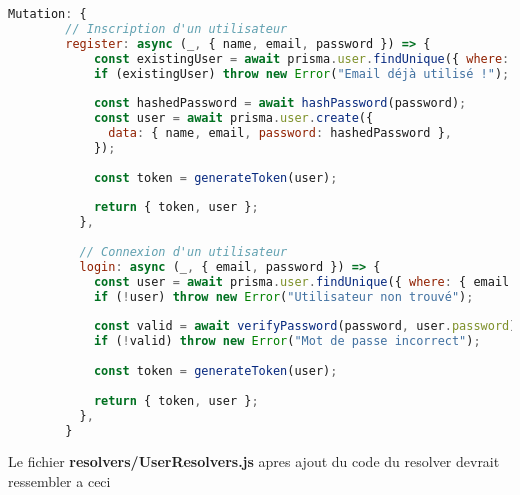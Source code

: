 \documentclass{article}
\begin{document}
    \begin{lstlisting}[language=JavaScript]
 Mutation: {
        // Inscription d'un utilisateur
        register: async (_, { name, email, password }) => {
            const existingUser = await prisma.user.findUnique({ where: { email } });
            if (existingUser) throw new Error("Email déjà utilisé !");
            
            const hashedPassword = await hashPassword(password);
            const user = await prisma.user.create({
              data: { name, email, password: hashedPassword },
            });
      
            const token = generateToken(user);
      
            return { token, user };
          },
      
          // Connexion d'un utilisateur
          login: async (_, { email, password }) => {
            const user = await prisma.user.findUnique({ where: { email } });
            if (!user) throw new Error("Utilisateur non trouvé");
      
            const valid = await verifyPassword(password, user.password);
            if (!valid) throw new Error("Mot de passe incorrect");
      
            const token = generateToken(user);
      
            return { token, user };
          },
        }
 \end{lstlisting}
 Le fichier \textbf{resolvers/UserResolvers.js} apres ajout du code du resolver devrait ressembler a ceci
\end{document}
